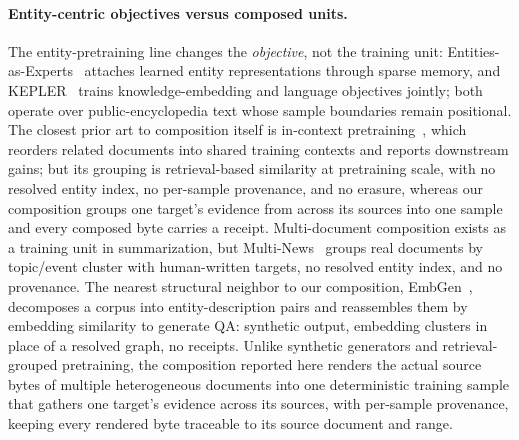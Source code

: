 \documentclass{article}
\begin{document}
\paragraph{Entity-centric objectives versus composed units.}
The entity-pretraining line changes the \emph{objective}, not the training unit: Entities-as-Experts~\cite{fevry2020entities} attaches learned entity representations through sparse memory, and KEPLER~\cite{wang2019kepler} trains knowledge-embedding and language objectives jointly; both operate over public-encyclopedia text whose sample boundaries remain positional. The closest prior art to composition itself is in-context pretraining~\cite{shi2023incontext}, which reorders related documents into shared training contexts and reports downstream gains; but its grouping is retrieval-based similarity at pretraining scale, with no resolved entity index, no per-sample provenance, and no erasure, whereas our composition groups one target's evidence from across its sources into one sample and every composed byte carries a receipt. Multi-document composition exists as a training unit in summarization, but Multi-News~\cite{fabbri2019multinews} groups real documents by topic/event cluster with human-written targets, no resolved entity index, and no provenance. The nearest structural neighbor to our composition, EmbGen~\cite{lenin2026embgen}, decomposes a corpus into entity-description pairs and reassembles them by embedding similarity to generate QA: synthetic output, embedding clusters in place of a resolved graph, no receipts. Unlike synthetic generators and retrieval-grouped pretraining, the composition reported here renders the actual source bytes of multiple heterogeneous documents into one deterministic training sample that gathers one target's evidence across its sources, with per-sample provenance, keeping every rendered byte traceable to its source document and range.
\end{document}
